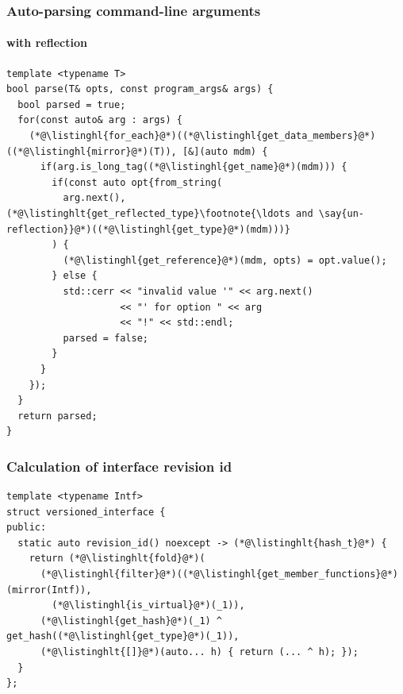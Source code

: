 \documentclass[compress,table,xcolor=table]{beamer}
\begin{document}
\begin{frame}[fragile]
  \frametitle{Auto-parsing command-line arguments}
  \framesubtitle{with reflection}
  \begin{lstlisting}[language=c++2x,basicstyle=\scriptsize\ttfamily]
template <typename T>
bool parse(T& opts, const program_args& args) {
  bool parsed = true;
  for(const auto& arg : args) {
    (*@\listinghl{for_each}@*)((*@\listinghl{get_data_members}@*)((*@\listinghl{mirror}@*)(T)), [&](auto mdm) {
      if(arg.is_long_tag((*@\listinghl{get_name}@*)(mdm))) {
        if(const auto opt{from_string(
          arg.next(), (*@\listinghlt{get_reflected_type}\footnote{\ldots and \say{un-reflection}}@*)((*@\listinghl{get_type}@*)(mdm)))}
        ) {
          (*@\listinghl{get_reference}@*)(mdm, opts) = opt.value();
        } else {
          std::cerr << "invalid value '" << arg.next()
                    << "' for option " << arg
                    << "!" << std::endl;
          parsed = false;
        }
      }
    });
  }
  return parsed;
}
  \end{lstlisting}
\end{frame}
\begin{frame}[fragile]
  \frametitle{Calculation of interface revision id}
  \begin{lstlisting}[language=c++2x,basicstyle=\small\ttfamily]
template <typename Intf>
struct versioned_interface {
public:
  static auto revision_id() noexcept -> (*@\listinghlt{hash_t}@*) {
    return (*@\listinghlt{fold}@*)(
      (*@\listinghl{filter}@*)((*@\listinghl{get_member_functions}@*)(mirror(Intf)),
        (*@\listinghl{is_virtual}@*)(_1)),
      (*@\listinghl{get_hash}@*)(_1) ^ get_hash((*@\listinghl{get_type}@*)(_1)),
      (*@\listinghlt{[]}@*)(auto... h) { return (... ^ h); });
  }
};
  \end{lstlisting}
\end{frame}
\end{document}
